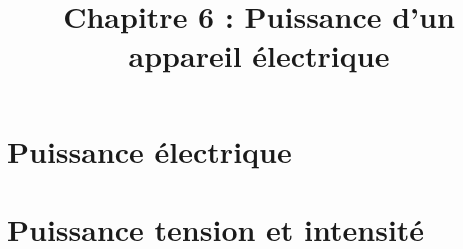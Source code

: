 \documentclass[xcolor={dvipsnames}]{beamer}
\title{Chapitre 6 : Puissance d'un appareil électrique}
\begin{document}
\begin{frame}
  \titlepage 
\end{frame}

\section{Puissance électrique}

\begin{frame}

\end{frame}

%		

\section{Puissance tension et intensité}



\begin{frame}

\end{frame}
\end{document}
